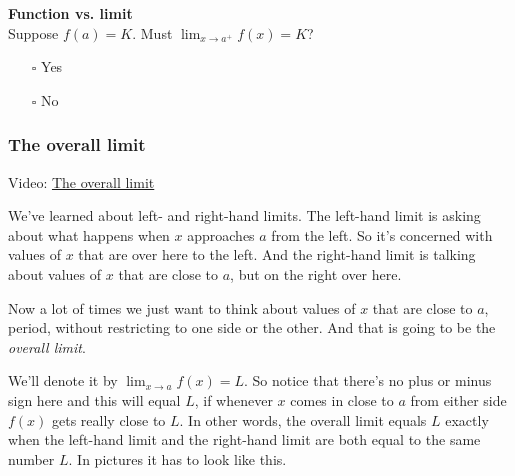 \documentclass[pdftex, brazil, 12pt, twoside]{article}
\begin{document}
\begin{exercise}
  \textbf{Function vs. limit}\\
  Suppose $f(a) = K$. Must $\lim_{x \to a^{+}} f(x) = K$?
  \begin{itemize}[noitemsep]
  \item[$\square$] Yes
  \item[$\square$] No
  \end{itemize}
\end{exercise}

\subsubsection{The overall limit}
\label{u0-intro-overall}

Video: \href{https://www.youtube.com/watch?v=O2BEgM8kHoY}{The overall limit}

We've learned about left- and right-hand limits.
The left-hand limit is asking about what happens when
$x$ approaches $a$ from the left.
So it's concerned with values of $x$
that are over here to the left.
And the right-hand limit is talking
about values of $x$ that are close to $a$,
but on the right over here.

Now a lot of times we just want to think
about values of $x$ that are close to $a$, period,
without restricting to one side or the other.
And that is going to be the \emph{overall limit}.

We'll denote it by $\displaystyle \lim_{x \to a}f(x) = L$.
So notice that there's no plus or minus sign here
and this will equal $L$, if whenever
$x$ comes in close to $a$ from either side
$f(x)$ gets really close to $L$.
In other words, the overall limit
equals $L$ exactly when the left-hand limit
and the right-hand limit are both equal to the same number
$L$. In pictures it has to look like this.

\begin{figure}[H]
  \begin{center}
  \end{center}
\end{figure}
\end{document}
